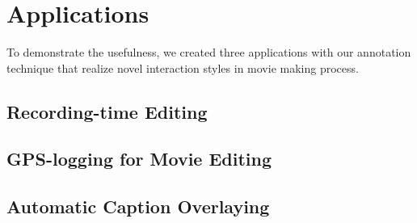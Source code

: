 \chapter{Applications}

To demonstrate the usefulness, we created three applications with our annotation technique that realize novel interaction styles in movie making process.

\section{Recording-time Editing}


\section{GPS-logging for Movie Editing}


\section{Automatic Caption Overlaying}
